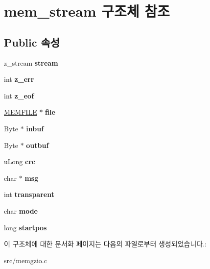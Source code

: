 \hypertarget{structmem__stream}{}\section{mem\+\_\+stream 구조체 참조}
\label{structmem__stream}
\subsection*{Public 속성}
\begin{DoxyCompactItemize}
\item 
\mbox{\label{structmem__stream_a8e95715455ffbde3f8bf840180eabd37}} 
z\+\_\+stream {\bfseries stream}
\item 
\mbox{\label{structmem__stream_a0049d60995cda5d1638ebce2a4eb3155}} 
int {\bfseries z\+\_\+err}
\item 
\mbox{\label{structmem__stream_ac41bfcdbcada66bebb9709e8638f6b80}} 
int {\bfseries z\+\_\+eof}
\item 
\mbox{\label{structmem__stream_a3bba5271c2ba53db444ce0b70d1c6fe1}} 
\mbox{\hyperlink{struct___mem_file}{M\+E\+M\+F\+I\+LE}} $\ast$ {\bfseries file}
\item 
\mbox{\label{structmem__stream_ad151b26e8ac236612276193c515b6e67}} 
Byte $\ast$ {\bfseries inbuf}
\item 
\mbox{\label{structmem__stream_a3c4eae5484fee4862306c274407f3d13}} 
Byte $\ast$ {\bfseries outbuf}
\item 
\mbox{\label{structmem__stream_a51276ceb0be94f2201a059c8697dc853}} 
u\+Long {\bfseries crc}
\item 
\mbox{\label{structmem__stream_a8b64f897dff31431aaf6608e32996e26}} 
char $\ast$ {\bfseries msg}
\item 
\mbox{\label{structmem__stream_ad970d09fe4cbcc6595b2d08b39d50db1}} 
int {\bfseries transparent}
\item 
\mbox{\label{structmem__stream_a30a6ad1cea6962847c45dd540d702f6f}} 
char {\bfseries mode}
\item 
\mbox{\label{structmem__stream_a50cada517a32582e93025846359ddec7}} 
long {\bfseries startpos}
\end{DoxyCompactItemize}


이 구조체에 대한 문서화 페이지는 다음의 파일로부터 생성되었습니다.\+:\begin{DoxyCompactItemize}
\item 
src/memgzio.\+c\end{DoxyCompactItemize}
